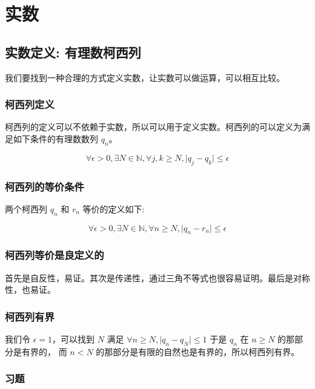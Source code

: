 
\chapter{实数}

\section{实数定义: 有理数柯西列}

我们要找到一种合理的方式定义实数，让实数可以做运算，可以相互比较。

\subsection{柯西列定义}

柯西列的定义可以不依赖于实数，所以可以用于定义实数。柯西列的可以定义为满足如下条件的有理数数列 $ q_n $。

\[ \forall \epsilon > 0, \exists N \in \mathbb{N}, 
    \forall j, k \ge N, \lvert q_j - q_k \rvert \le \epsilon \] 

\subsection{柯西列的等价条件}

两个柯西列 $q_n$ 和 $r_n$ 等价的定义如下:

\[ 
    \forall \epsilon > 0, \exists N \in \mathbb{N},
    \forall n \ge N, \lvert q_n - r_n \rvert \le \epsilon 
\]

\subsection{柯西列等价是良定义的}

首先是自反性，易证。其次是传递性，通过三角不等式也很容易证明。最后是对称性，也易证。

\subsection{柯西列有界}

我们令 $\epsilon = 1 $，可以找到 $N$ 满足 $\forall n \ge N , \lvert q_n - q_N \rvert \le 1 $ 于是 $q_n$ 在 $n \ge N$ 的那部分是有界的，
而 $n < N$ 的那部分是有限的自然也是有界的，所以柯西列有界。

\subsection{习题}

